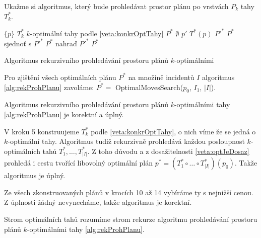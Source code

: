 Ukažme si algoritmus, který bude prohledávat prostor plánu po vrstvách $P_k$ tahy $T^*_k$.

\begin{algorithm}[h]
  \begin{algorithmic}[1]
      \State \Return $\{ p \}$
    \EndIf
    \State $T^*_k$ \gets $k$-optimální tahy podle \ref{veta:konkrOptTahy}
    \State $P^*$ \gets $\emptyset$
      \State $p'$ \gets $T^*(p)$
      \State $P'^*$ \gets {}
        \State $P^*$ sjednoť s $P'^*$
        \State $P^*$ nahraď $P'^*$
      \EndIf
    \EndFor
    \State \Return $P^*$
  \EndFunction
  \end{algorithmic}
  \caption{Algoritmus rekurzivního prohledávání prostoru plánů $k$-optimálními}
  \label{alg:rekProhPlanu}
\end{algorithm}

Pro zjištění všech optimálních plánu $P^*$ na množině incidentů $I$ algoritmus \ref{alg:rekProhPlanu} zavoláme: $P^* = $ OptimalMovesSearch($p_0$, $I_1$, $|I|$).

\begin{veta}
  Algoritmus rekurzivního prohledávání prostoru plánů $k$-optimálními tahy \ref{alg:rekProhPlanu} je korektní a úplný.
\end{veta}
\begin{dukaz}
  V kroku 5 konstruujeme $T^*_k$ podle \ref{veta:konkrOptTahy}, o nich víme že se jedná o $k$-optimální tahy.
  Algoritmus tudiž rekurzivně prohledává každou posloupnost $k$-optimálních tahů $T^*_1, \dots, T^*_{|I|}$.
  Z toho důvodu a z dosažitelnosti \ref{veta:optJeDosaz} prohledá i cestu tvořící libovolný optimální plán $p^* = (T^*_1 \circ \dots \circ T^*_{|I|})(p_0)$.
  Takže algoritmus je úplný.

  Ze všech zkonstruovaných plánů v krocích 10 až 14 vybíráme ty s nejnižší cenou.
  Z úplnosti žádný nevynecháme, takže algoritmus je korektní.
\end{dukaz}

\begin{definice}
  Strom optimálních tahů rozumíme strom rekurze algoritmu prohledávání prostoru plánů $k$-optimálními tahy \ref{alg:rekProhPlanu}.
\end{definice}


